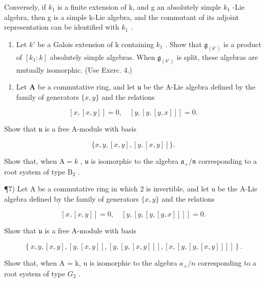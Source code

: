 Conversely, if \(k_{1}\) is a finite extension of k, and g an absolutely simple \(k_{1}\) -Lie algebra, then g is a simple k-Lie algebra, and the commutant of its adjoint representation can be identified with \(k_{1}\) .

\begin{enumerate}
\def\labelenumi{\alph{enumi})}
\setcounter{enumi}{1}
\tightlist
\item
  Let \(k'\) be a Galois extension of k containing \(k_{1}\) . Show that \(\mathfrak{g}_{(k')}\) is a product of \([k_{1}:k]\) absolutely simple algebras. When \(\mathfrak{g}_{(k')}\) is split, these algebras are mutually isomorphic. (Use Exerc. 4.)
\end{enumerate}

\begin{enumerate}
\def\labelenumi{\arabic{enumi})}
\setcounter{enumi}{5}
\tightlist
\item
  Let \(\mathbf{A}\) be a commutative ring, and let \(\mathfrak{u}\) be the A-Lie algebra defined by the family of generators \(\{x, y\}\) and the relations
\end{enumerate}

\[
[ x, [ x, y ] ] = 0, \quad [ y, [ y, [ y, x ] ] ] = 0.
\]

Show that \(\mathfrak{u}\) is a free A-module with basis

\[
\{x, y, [ x, y ], [ y, [ x, y ] ] \}.
\]

Show that, when \(\mathrm{A} = k\) , \(\mathfrak{u}\) is isomorphic to the algebra \(\mathfrak{a}_{+} / \mathfrak{n}\) corresponding to a root system of type \(\mathrm{B}_2\) .

¶7) Let A be a commutative ring in which 2 is invertible, and let u be the A-Lie algebra defined by the family of generators \(\{x,y\}\) and the relations

\[
[ x, [ x, y ] ] = 0, \quad [ y, [ y, [ y, [ y, x ] ] ] ] = 0.
\]

Show that \(\mathfrak{u}\) is a free A-module with basis

\[
\left. \right.\left\{x, y, [ x, y ], [ y, [ x, y ] ], [ y, [ y, [ x, y ] ] ], [ x, [ y, [ y, [ x, y ] ] ] ] \right\}.
\]

Show that, when A = k, u is isomorphic to the algebra \(a_{+}/n\) corresponding to a root system of type \(G_{2}\) .

